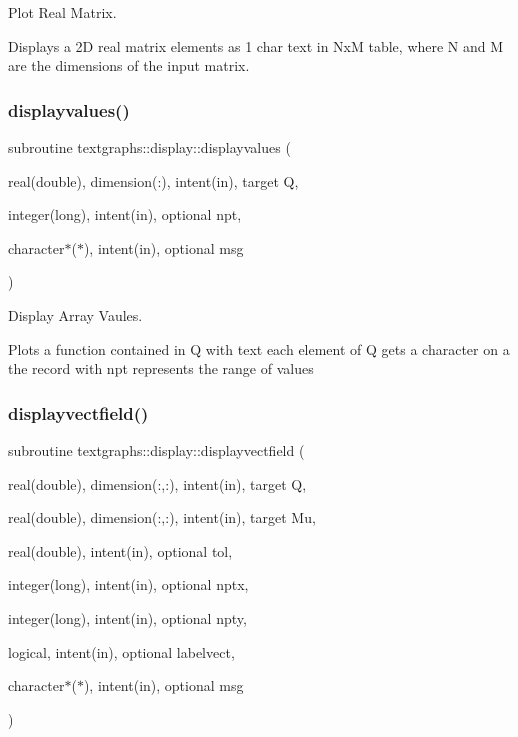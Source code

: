 Plot Real Matrix. 

Displays a 2D real matrix elements as 1 char text in NxM table, where N and M are the dimensions of the input matrix. \mbox{\label{interfacetextgraphs_1_1display_ac47b1a55cfdca825dd26ca969ab5bf38}} 
\subsubsection{\texorpdfstring{displayvalues()}{displayvalues()}}
{\footnotesize\ttfamily subroutine textgraphs\+::display\+::displayvalues (\begin{DoxyParamCaption}\item[{real(double), dimension(\+:), intent(in), target}]{Q,  }\item[{integer(long), intent(in), optional}]{npt,  }\item[{character$\ast$($\ast$), intent(in), optional}]{msg }\end{DoxyParamCaption})\hspace{0.3cm}{\ttfamily [private]}}



Display Array Vaules. 

Plots a function contained in Q with text each element of Q gets a character on a the record with npt represents the range of values \mbox{\label{interfacetextgraphs_1_1display_a2c20d3e1fdb1272f9bf904e114c21313}} 
\subsubsection{\texorpdfstring{displayvectfield()}{displayvectfield()}}
{\footnotesize\ttfamily subroutine textgraphs\+::display\+::displayvectfield (\begin{DoxyParamCaption}\item[{real(double), dimension(\+:,\+:), intent(in), target}]{Q,  }\item[{real(double), dimension(\+:,\+:), intent(in), target}]{Mu,  }\item[{real(double), intent(in), optional}]{tol,  }\item[{integer(long), intent(in), optional}]{nptx,  }\item[{integer(long), intent(in), optional}]{npty,  }\item[{logical, intent(in), optional}]{labelvect,  }\item[{character$\ast$($\ast$), intent(in), optional}]{msg }\end{DoxyParamCaption})\hspace{0.3cm}{\ttfamily [private]}}



